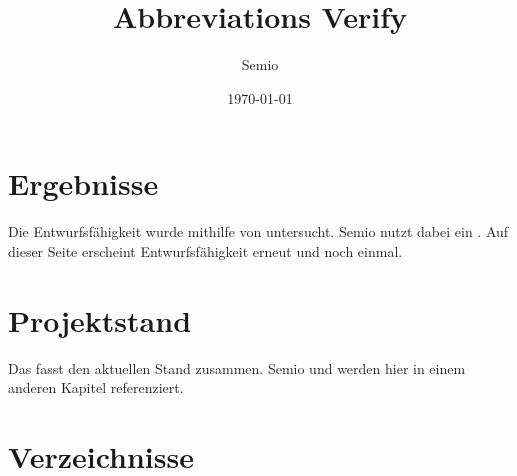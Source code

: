 \documentclass[type=report,theme=light,language=de]{semio}
\title{Abbreviations Verify}
\author{Semio}
\date{\today}
\begin{document}
\maketitle

\chapter{Ergebnisse}
Die \Gls{Entwurfsfähigkeit} wurde mithilfe von  untersucht.
\Gls{Semio} nutzt dabei ein .
Auf dieser Seite erscheint \Gls{Entwurfsfähigkeit} erneut und  noch einmal.

\chapter{Projektstand}
Das  fasst den aktuellen Stand zusammen.
\Gls{Semio} und  werden hier in einem anderen Kapitel referenziert.

\appendix
\chapter{Verzeichnisse}
\listofglossaries
\listofabbreviations
\end{document}
